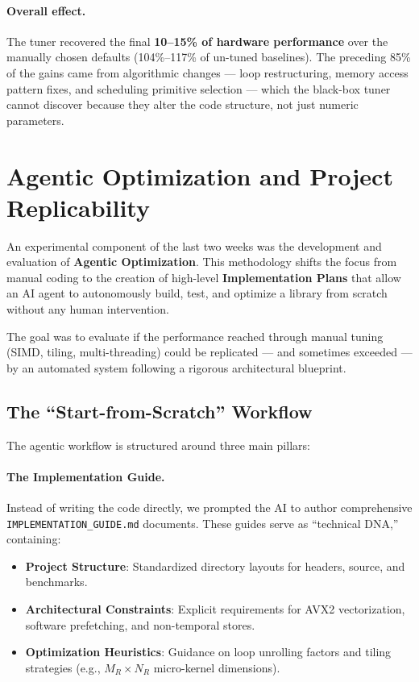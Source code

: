 \documentclass[11pt,a4paper]{article}
\begin{document}
\paragraph{Overall effect.}
The tuner recovered the final \textbf{10--15\% of hardware performance} over the manually chosen defaults (104\%--117\% of un-tuned baselines). The preceding 85\% of the gains came from algorithmic changes — loop restructuring, memory access pattern fixes, and scheduling primitive selection — which the black-box tuner cannot discover because they alter the code structure, not just numeric parameters.

\section{Agentic Optimization and Project Replicability}

An experimental component of the last two weeks was the development and evaluation of \textbf{Agentic Optimization}. This methodology shifts the focus from manual coding to the creation of high-level \textbf{Implementation Plans} that allow an AI agent to autonomously build, test, and optimize a library from scratch without any human intervention.

The goal was to evaluate if the performance reached through manual tuning (SIMD, tiling, multi-threading) could be replicated --- and sometimes exceeded --- by an automated system following a rigorous architectural blueprint.

\subsection{The ``Start-from-Scratch'' Workflow}
The agentic workflow is structured around three main pillars:

\paragraph{The Implementation Guide.}
Instead of writing the code directly, we prompted the AI to author comprehensive \texttt{IMPLEMENTATION\_GUIDE.md} documents. These guides serve as ``technical DNA,'' containing:
\begin{itemize}
    \item \textbf{Project Structure}: Standardized directory layouts for headers, source, and benchmarks.
    \item \textbf{Architectural Constraints}: Explicit requirements for AVX2 vectorization, software prefetching, and non-temporal stores.
    \item \textbf{Optimization Heuristics}: Guidance on loop unrolling factors and tiling strategies (e.g., $M_R \times N_R$ micro-kernel dimensions).
\end{itemize}
\end{document}
